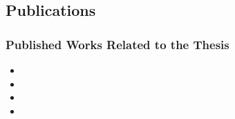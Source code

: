 \subsection{Publications}
\subsubsection{Published Works Related to the Thesis}
\begin{itemize}
	\item {}
	\item {} 
	\item {}
  \item {}
\end{itemize}

